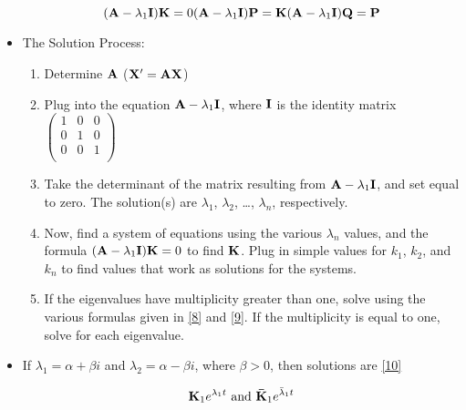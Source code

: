 \documentclass[12pt]{article}
\begin{document}
\begin{itemize}
    \begin{equation}
      (\bold{A}-\lambda_1\bold{I})\bold{K}=0\\
      (\bold{A}-\lambda_1\bold{I})\bold{P}=\bold{K}\\
      (\bold{A}-\lambda_1\bold{I})\bold{Q}=\bold{P}\\
      \label{9}
    \end{equation}

  \item The Solution Process:

    \begin{enumerate}

      \item Determine $\bold{A}$ ($\bold{X}'=\bold{AX}$)

      \item Plug into the equation $\bold{A}-\lambda_1\bold{I}$, where $\bold{I}$ is the identity matrix $\begin{pmatrix} 1 & 0 & 0\\ 0 & 1 & 0 \\ 0 & 0 & 1 \\ \end{pmatrix}$

      \item Take the determinant of the matrix resulting from $\bold{A}-\lambda_1\bold{I}$, and set equal to zero. The solution(s) are $\lambda_1$, $\lambda_2$, \dots, $\lambda_n$, respectively.

      \item Now, find a system of equations using the various $\lambda_n$ values, and the formula $(\bold{A}-\lambda_1\bold{I})\bold{K}=0$ to find $\bold{K}$. Plug in simple values for $k_1$, $k_2$, and $k_n$ to find values that work as solutions for the systems. 

      \item If the eigenvalues have multiplicity greater than one, solve using the various formulas given in \eqref{8} and \eqref{9}. If the multiplicity is equal to one, solve for each eigenvalue. 

    \end{enumerate}

  \item If $\lambda_1=\alpha+\beta i$ and $\lambda_2=\alpha - \beta i$, where $\beta>0$, then solutions are \eqref{10}

    \begin{equation}
      \bold{K}_1e^{\lambda_1 t}\text{ and } \bold{\bar{K}}_1e^{\bar{\lambda}_1 t}
      \label{10}
    \end{equation}


\end{itemize}
\end{document}
